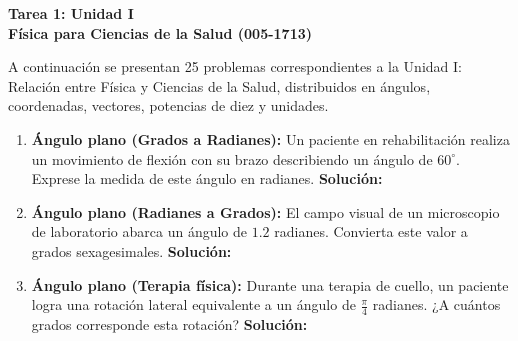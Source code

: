 \documentclass[12pt,letterpaper]{article}
\begin{document}
\begin{center}
    \textbf{\Large Tarea 1: Unidad I}\\
    \vspace{0.2cm}
    \textbf{Física para Ciencias de la Salud (005-1713)}\\
\end{center}

\vspace{0.5cm}
\noindent A continuación se presentan 25 problemas correspondientes a la Unidad I: Relación entre Física y Ciencias de la Salud, distribuidos en ángulos, coordenadas, vectores, potencias de diez y unidades.

\vspace{0.5cm}

\begin{enumerate}

    \item \textbf{Ángulo plano (Grados a Radianes):} Un paciente en rehabilitación realiza un movimiento de flexión con su brazo describiendo un ángulo de $60^\circ$. Exprese la medida de este ángulo en radianes.
    \textbf{Solución:} \\

    \item \textbf{Ángulo plano (Radianes a Grados):} El campo visual de un microscopio de laboratorio abarca un ángulo de $1.2$ radianes. Convierta este valor a grados sexagesimales.
    \textbf{Solución:} \\

    
    \item \textbf{Ángulo plano (Terapia física):} Durante una terapia de cuello, un paciente logra una rotación lateral equivalente a un ángulo de $\frac{\pi}{4}$ radianes. ¿A cuántos grados corresponde esta rotación?
    \textbf{Solución:} \\

    

\end{enumerate}
\end{document}
